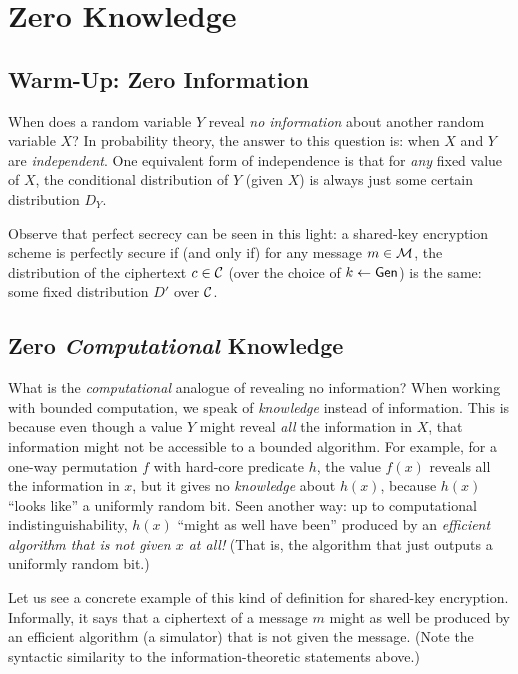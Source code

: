 \documentclass[11pt]{article}
\begin{document}
\thispagestyle{fancy} %


\section{Zero Knowledge}
\label{sec:zero-knowledge}

\subsection{Warm-Up: Zero Information}
\label{sec:warm-up-zero-inf}

When does a random variable $Y$ reveal \emph{no information} about
another random variable $X$?  In probability theory, the answer to
this question is: when $X$ and $Y$ are \emph{independent}.  One
equivalent form of independence is that for \emph{any} fixed value of
$X$, the conditional distribution of $Y$ (given $X$) is always just
some certain distribution $D_{Y}$.

Observe that perfect secrecy can be seen in this light: a shared-key
encryption scheme is perfectly secure if (and only if) for any message
$m \in \mathcal{M}$, the distribution of the ciphertext $c \in \mathcal{C}$
(over the choice of $k \gets \mathsf{Gen}$) is the same: some fixed
distribution $D'$ over $\mathcal{C}$.

\subsection{Zero \emph{Computational} Knowledge}
\label{sec:zero-comp-knowl}

What is the \emph{computational} analogue of revealing no information?
When working with bounded computation, we speak of \emph{knowledge}
instead of information.  This is because even though a value $Y$ might
reveal \emph{all} the information in $X$, that information might not
be accessible to a bounded algorithm.  For example, for a one-way
permutation $f$ with hard-core predicate $h$, the value $f(x)$ reveals
all the information in $x$, but it gives no \emph{knowledge} about
$h(x)$, because $h(x)$ ``looks like'' a uniformly random bit.  Seen
another way: up to computational indistinguishability, $h(x)$ ``might
as well have been'' produced by an \emph{efficient algorithm that is
  not given $x$ at all!}  (That is, the algorithm that just outputs a
uniformly random bit.)

Let us see a concrete example of this kind of definition for
shared-key encryption.  Informally, it says that a ciphertext of a
message $m$ might as well be produced by an efficient algorithm (a
simulator) that is not given the message.  (Note the syntactic
similarity to the information-theoretic statements above.)
\end{document}
